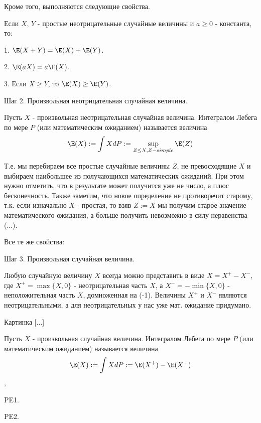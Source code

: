 {Кроме того, выполняются следующие свойства.

Если $X$, $Y$ - простые неотрицательные случайные величины и $a\geq 0$ - константа, то:

1. $\E(X+Y)=\E(X)+\E(Y)$.

2. $\E(aX)=a\E(X)$.

3. Если $X\geq Y$, то $\E(X)\geq \E(Y)$.


Шаг 2. Произвольная неотрицательная случайная величина.

\begin{mydef}
Пусть $X$ - произвольная неотрицательная случайная величина. Интегралом Лебега по мере $P$ (или математическим ожиданием) называется величина
\begin{equation}
\E(X):=\int X dP:=\sup_{Z\leq X, Z-simple}  \E(Z)
\end{equation}
\end{mydef}

Т.е. мы перебираем все простые случайные величины $Z$, не превосходящие $X$ и выбираем наибольшее из получающихся математических ожиданий. При этом нужно отметить, что в результате может получится уже не число, а плюс бесконечность. Также заметим, что новое определение не противоречит старому, т.к. если изначально $X$ - простая, то взяв $Z:=X$ мы получим старое значение математического ожидания, а больше получить невозможно в силу неравенства (...).


Все те же свойства:


Шаг 3. Произвольная случайная величина.

Любую случайную величину $X$ всегда можно представить в виде $X=X^{+}-X^{-}$, где $X^{+}=\max\{X,0\}$ - неотрицательная часть $X$, а $X^{-}=-\min\{X,0\}$ - неположительная часть $X$, домноженная на (-1). Величины $X^{+}$ и $X^{-}$ являются неотрицательными, а для неотрицательных у нас уже мат. ожидание придумано.

Картинка [...]

\begin{mydef}
Пусть $X$ - произвольная случайная величина. Интегралом Лебега по мере $P$ (или математическим ожиданием) называется величина
\begin{equation}
\E(X):=\int X dP:=\E(X^{+})-\E(X^{-})
\end{equation},

\end{mydef}




PE1. 

PE2.


}
